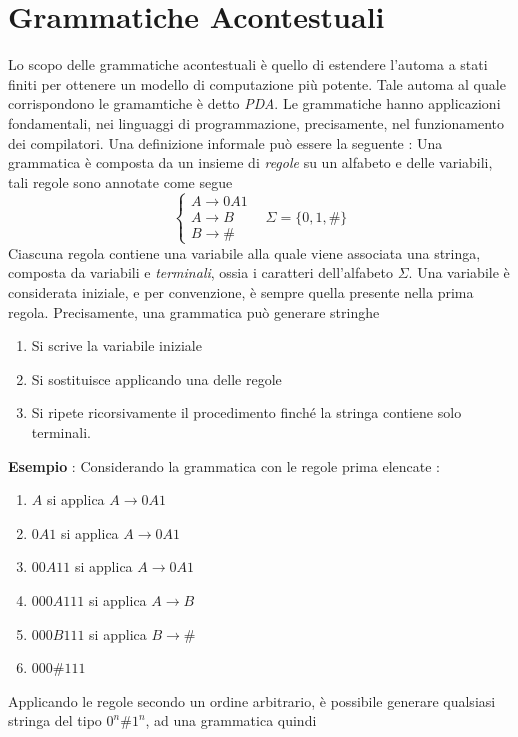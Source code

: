 \documentclass[10pt, letterpaper]{report}
\begin{document}
 \section{Grammatiche Acontestuali}
 Lo scopo delle grammatiche acontestuali è quello di estendere  
 l'automa a stati finiti per ottenere un modello di computazione più 
 potente. Tale automa al quale corrispondono le gramamtiche è 
 detto \textit{PDA}. Le grammatiche hanno applicazioni fondamentali, 
 nei linguaggi di programmazione, precisamente, nel funzionamento 
 dei compilatori.\acc 
 Una definizione informale può essere la seguente : Una grammatica è 
composta da un insieme di \textit{regole} su un alfabeto e delle variabili, tali 
regole sono annotate come segue $$\begin{cases}
    A\longrightarrow 0A1\\ 
    A \longrightarrow B \\
    B \longrightarrow \#
\end{cases}\ \ \ \ \Sigma = \{0,1,\#\} $$
Ciascuna regola contiene una variabile alla quale viene associata una stringa, 
composta da variabili e \textit{terminali}, ossia i caratteri dell'alfabeto $\Sigma$.
Una variabile è considerata iniziale, e per convenzione, è sempre quella 
presente nella prima regola.\acc 
Precisamente, una grammatica può generare stringhe\begin{enumerate}
    \item Si scrive la variabile iniziale 
    \item Si sostituisce applicando una delle regole 
    \item Si ripete ricorsivamente il procedimento finché la stringa contiene 
    solo terminali.
\end{enumerate}
\textbf{Esempio} : Considerando la grammatica con le regole prima elencate :\begin{enumerate}
    \item $A$ si applica $A\longrightarrow 0A1$
    \item $0A1$ si applica $A\longrightarrow 0A1$ 
    \item $00A11$ si applica $A\longrightarrow 0A1$ 
    \item $000A111$ si applica $A\longrightarrow B$
    \item $000B111$ si applica $B\longrightarrow \#$
    \item $000\#111$
\end{enumerate}
Applicando le regole secondo un ordine arbitrario, è possibile 
generare qualsiasi stringa del tipo $0^n\#1^n$, ad una grammatica quindi 
\end{document}
